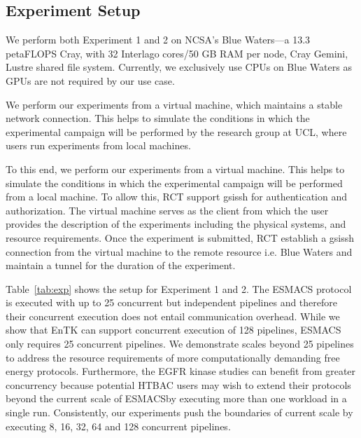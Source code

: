 \documentclass{bmcart}
\begin{document}
\subsection{Experiment Setup}\label{ssec:exp_setup}

We perform both Experiment 1 and 2 on NCSA's Blue Waters---a 13.3 petaFLOPS
Cray, with 32 Interlago cores/50 GB RAM per node, Cray Gemini, Lustre shared
file system. Currently, we exclusively use CPUs on Blue Waters as GPUs are
not required by our use case. 


We perform our experiments from a virtual machine, which maintains a stable network connection. This helps to simulate the conditions in which the experimental campaign will be performed by the research group at UCL\@, where users run experiments from local machines. 



To this end, we perform our experiments from a virtual machine. This
helps to simulate the conditions in which the experimental campaign will be
performed from a local machine. To allow this, RCT support \textmd{gsissh} for
authentication and authorization. The virtual machine serves as the client from 
which the user provides the description of the experiments including the physical systems, and resource requirements. Once the experiment is submitted, RCT establish a gsissh connection from the virtual machine to the remote resource i.e. Blue Waters and maintain a tunnel for the duration of the experiment. 

Table~\ref{tab:exp} shows the setup for Experiment 1 and 2. The ESMACS
protocol is executed with up to 25 concurrent but independent pipelines and
therefore their concurrent execution does not entail communication overhead. While 
we show that EnTK can support concurrent execution of 128 pipelines, ESMACS only 
requires 25 concurrent pipelines. We demonstrate scales beyond 25 pipelines to 
address the resource requirements of more computationally demanding free energy
protocols. Furthermore, the EGFR kinase studies can benefit 
from greater concurrency because potential HTBAC users may wish to extend their 
protocols beyond the current scale of ESMACS\@ by executing more than one 
workload in a single run. Consistently, our experiments 
push the boundaries of current scale by executing 8, 16, 32, 64 and 128 
concurrent pipelines.
\end{document}
